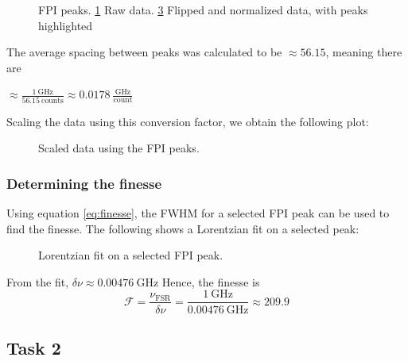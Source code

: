 \documentclass{article}
\begin{document}
\begin{figure}[h]
	\centering
	\begin{subfigure}[t]{0.45\textwidth}
		\centering
		\scalebox{0.5}{}
		\caption{}
		\label{fig:peaks}
	\end{subfigure}
	\begin{subfigure}[t]{0.45\textwidth}
		\centering
		\scalebox{0.5}{}
		\caption{}
		\label{fig:normalized_peaks}
	\end{subfigure}
	\caption{FPI peaks. \ref{fig:peaks} Raw data. \ref{fig:normalized_peaks} Flipped and normalized data, with peaks highlighted}
\end{figure}

The average spacing between peaks was calculated to be $\approx 56.15$, meaning there are

$\approx \frac{1 \ \text{GHz}}{56.15 \ \text{counts}} \approx 0.0178 \ \frac{\text{GHz}}{\text{count}}$ 

Scaling the data using this conversion factor, we obtain the following plot:

\begin{figure}[h]
	\centering
	
	\caption{Scaled data using the FPI peaks.}
	\label{fig:scaled_data}
\end{figure}

\pagebreak{}

\subsubsection{Determining the finesse}

Using equation \ref{eq:finesse}, the FWHM for a selected FPI peak can be used to find the finesse. The following shows a Lorentzian fit on a selected peak:

\begin{figure}[h]
	\centering
	
	\caption{Lorentzian fit on a selected FPI peak.}
	\label{fig:lorentzian_fit}
\end{figure}

From the fit, $\delta \nu \approx 0.00476 \ \text{GHz}$ Hence, the finesse is \[ \mathscr{F} = \frac{\nu_{\text{FSR}}}{\delta \nu} = \frac{1 \ \text{GHz}}{0.00476 \ \text{GHz}} \approx 209.9\]

\pagebreak{}

\subsection{Task 2}
\end{document}
